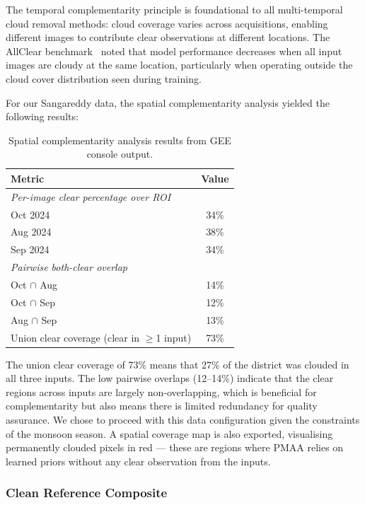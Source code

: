 \documentclass[12pt,a4paper]{article}
\begin{document}
The temporal complementarity principle is foundational to all multi-temporal cloud removal methods: cloud coverage varies across acquisitions, enabling different images to contribute clear observations at different locations. The AllClear benchmark~\cite{zhao2024allclear} noted that model performance decreases when all input images are cloudy at the same location, particularly when operating outside the cloud cover distribution seen during training.

For our Sangareddy data, the spatial complementarity analysis yielded the following results:

\begin{table}[H]
\centering
\caption{Spatial complementarity analysis results from GEE console output.}
\label{tab:complementarity}
\begin{tabular}{lc}
\toprule
\textbf{Metric} & \textbf{Value} \\
\midrule
\multicolumn{2}{l}{\textit{Per-image clear percentage over ROI}} \\
\quad Oct 2024 & 34\% \\
\quad Aug 2024 & 38\% \\
\quad Sep 2024 & 34\% \\
\midrule
\multicolumn{2}{l}{\textit{Pairwise both-clear overlap}} \\
\quad Oct $\cap$ Aug & 14\% \\
\quad Oct $\cap$ Sep & 12\% \\
\quad Aug $\cap$ Sep & 13\% \\
\midrule
Union clear coverage (clear in $\geq$1 input) & 73\% \\
\bottomrule
\end{tabular}
\end{table}

The union clear coverage of 73\% means that 27\% of the district was clouded in all three inputs. The low pairwise overlaps (12--14\%) indicate that the clear regions across inputs are largely non-overlapping, which is beneficial for complementarity but also means there is limited redundancy for quality assurance. We chose to proceed with this data configuration given the constraints of the monsoon season. A spatial coverage map is also exported, visualising permanently clouded pixels in red --- these are regions where PMAA relies on learned priors without any clear observation from the inputs.

\subsubsection{Clean Reference Composite}
\end{document}

